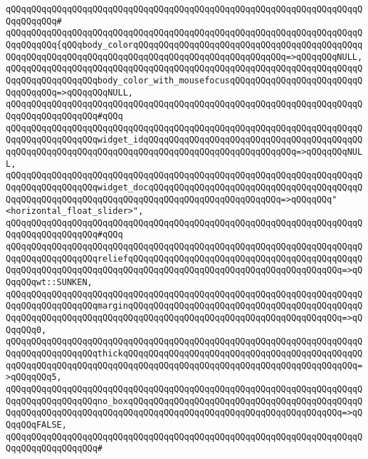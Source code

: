 \verb|qQQqqQQqqQQqqQQqqQQqqQQqqQQqqQQqqQQqqQQqqQQqqQQqqQQqqQQqqQQqqQQqqQQqqQQqqQQqqQQq#|\newline
\verb|qQQqqQQqqQQqqQQqqQQqqQQqqQQqqQQqqQQqqQQqqQQqqQQqqQQqqQQqqQQqqQQqqQQqqQQqqQQqqQQq{qQQqbody_colorqQQqqQQqqQQqqQQqqQQqqQQqqQQqqQQqqQQqqQQqqQQqqQQqqQQqqQQqqQQqqQQqqQQqqQQqqQQqqQQqqQQqqQQqqQQqqQQqqQQq=>qQQqqQQqNULL,|\newline
\verb|qQQqqQQqqQQqqQQqqQQqqQQqqQQqqQQqqQQqqQQqqQQqqQQqqQQqqQQqqQQqqQQqqQQqqQQqqQQqqQQqqQQqqQQqbody_color_with_mousefocusqQQqqQQqqQQqqQQqqQQqqQQqqQQqqQQqqQQq=>qQQqqQQqNULL,|\newline
\verb|qQQqqQQqqQQqqQQqqQQqqQQqqQQqqQQqqQQqqQQqqQQqqQQqqQQqqQQqqQQqqQQqqQQqqQQqqQQqqQQqqQQqqQQq#qQQq|\newline
\verb|qQQqqQQqqQQqqQQqqQQqqQQqqQQqqQQqqQQqqQQqqQQqqQQqqQQqqQQqqQQqqQQqqQQqqQQqqQQqqQQqqQQqqQQqwidget_idqQQqqQQqqQQqqQQqqQQqqQQqqQQqqQQqqQQqqQQqqQQqqQQqqQQqqQQqqQQqqQQqqQQqqQQqqQQqqQQqqQQqqQQqqQQqqQQqqQQq=>qQQqqQQqNULL,|\newline
\verb|qQQqqQQqqQQqqQQqqQQqqQQqqQQqqQQqqQQqqQQqqQQqqQQqqQQqqQQqqQQqqQQqqQQqqQQqqQQqqQQqqQQqqQQqwidget_docqQQqqQQqqQQqqQQqqQQqqQQqqQQqqQQqqQQqqQQqqQQqqQQqqQQqqQQqqQQqqQQqqQQqqQQqqQQqqQQqqQQqqQQqqQQqqQQq=>qQQqqQQq"<horizontal_float_slider>",|\newline
\verb|qQQqqQQqqQQqqQQqqQQqqQQqqQQqqQQqqQQqqQQqqQQqqQQqqQQqqQQqqQQqqQQqqQQqqQQqqQQqqQQqqQQqqQQq#qQQq|\newline
\verb|qQQqqQQqqQQqqQQqqQQqqQQqqQQqqQQqqQQqqQQqqQQqqQQqqQQqqQQqqQQqqQQqqQQqqQQqqQQqqQQqqQQqqQQqreliefqQQqqQQqqQQqqQQqqQQqqQQqqQQqqQQqqQQqqQQqqQQqqQQqqQQqqQQqqQQqqQQqqQQqqQQqqQQqqQQqqQQqqQQqqQQqqQQqqQQqqQQqqQQqqQQq=>qQQqqQQqwt::SUNKEN,|\newline
\verb|qQQqqQQqqQQqqQQqqQQqqQQqqQQqqQQqqQQqqQQqqQQqqQQqqQQqqQQqqQQqqQQqqQQqqQQqqQQqqQQqqQQqqQQqmarginqQQqqQQqqQQqqQQqqQQqqQQqqQQqqQQqqQQqqQQqqQQqqQQqqQQqqQQqqQQqqQQqqQQqqQQqqQQqqQQqqQQqqQQqqQQqqQQqqQQqqQQqqQQqqQQq=>qQQqqQQq0,|\newline
\verb|qQQqqQQqqQQqqQQqqQQqqQQqqQQqqQQqqQQqqQQqqQQqqQQqqQQqqQQqqQQqqQQqqQQqqQQqqQQqqQQqqQQqqQQqthickqQQqqQQqqQQqqQQqqQQqqQQqqQQqqQQqqQQqqQQqqQQqqQQqqQQqqQQqqQQqqQQqqQQqqQQqqQQqqQQqqQQqqQQqqQQqqQQqqQQqqQQqqQQqqQQqqQQq=>qQQqqQQq5,|\newline
\verb|qQQqqQQqqQQqqQQqqQQqqQQqqQQqqQQqqQQqqQQqqQQqqQQqqQQqqQQqqQQqqQQqqQQqqQQqqQQqqQQqqQQqqQQqno_boxqQQqqQQqqQQqqQQqqQQqqQQqqQQqqQQqqQQqqQQqqQQqqQQqqQQqqQQqqQQqqQQqqQQqqQQqqQQqqQQqqQQqqQQqqQQqqQQqqQQqqQQqqQQqqQQq=>qQQqqQQqFALSE,|\newline
\verb|qQQqqQQqqQQqqQQqqQQqqQQqqQQqqQQqqQQqqQQqqQQqqQQqqQQqqQQqqQQqqQQqqQQqqQQqqQQqqQQqqQQqqQQq#|\newline
